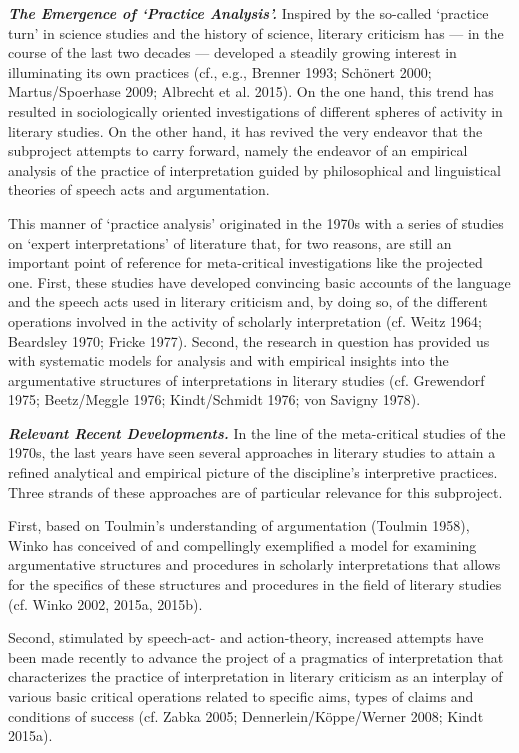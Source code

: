 \noindent \textbf{\emph{The Emergence of `Practice Analysis'.}} Inspired by the so-called `practice turn' in science studies and the history of science, literary criticism has --- in the course of the last two decades --- developed a steadily growing interest in illuminating its own practices (cf., e.g., Brenner 1993; Sch\"onert 2000; Martus/Spoerhase 2009; Albrecht et al. 2015). On the one hand, this trend has resulted in sociologically oriented investigations of different spheres of activity in literary studies. On the other hand, it has revived the very endeavor that the subproject attempts to carry forward, namely the endeavor of an empirical analysis of the practice of interpretation guided by philosophical and linguistical theories of speech acts and argumentation. 

This manner of `practice analysis' originated in the 1970s with a series of studies on `expert interpretations' of literature that, for two reasons, are still an important point of reference for meta-critical investigations like the projected one. First, these studies have developed convincing basic accounts of the language and the speech acts used in literary criticism and, by doing so, of the different operations involved in the activity of scholarly interpretation (cf. Weitz 1964; Beardsley 1970; Fricke 1977). Second, the research in question has provided us with systematic models for analysis and with empirical insights into the argumentative structures of interpretations in literary studies (cf. Grewendorf 1975; Beetz/Meggle 1976; Kindt/Schmidt 1976; von Savigny 1978). 

\vspace{.2cm}
\noindent \textbf{\emph{Relevant Recent Developments.}} In the line of the meta-critical studies of the 1970s, the last years have seen several approaches in literary studies to attain a refined analytical and empirical picture of the discipline's interpretive practices. Three strands of these approaches are of particular relevance for this subproject. 

First, based on Toulmin's understanding of argumentation (Toulmin 1958), Winko has conceived of and compellingly exemplified a model for examining argumentative structures and procedures in scholarly interpretations that allows for the specifics of these structures and procedures in the field of literary studies (cf. Winko 2002, 2015a, 2015b).

Second, stimulated by speech-act- and action-theory, increased attempts have been made recently to advance the project of a pragmatics of interpretation that characterizes the practice of interpretation in literary criticism as an interplay of various basic critical operations related to specific aims, types of claims and conditions of success (cf. Zabka 2005; Dennerlein/K\"oppe/Werner 2008; Kindt 2015a). 


